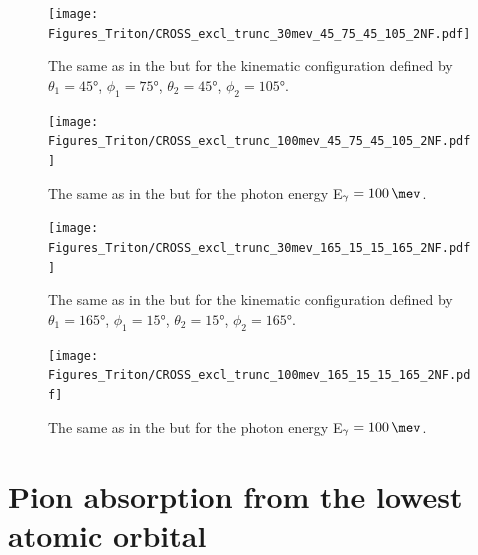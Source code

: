     \begin{figure}[h]
        \begin{center}
            \texttt{[image: Figures\_Triton/CROSS\_excl\_trunc\_30mev\_45\_75\_45\_105\_2NF.pdf]}
            \end{center}
            \caption{The same as in the  but for the kinematic
            configuration defined by
            $\theta_1 = \ang{45}$, $\phi_1 = \ang{75}$,
            $\theta_2 = \ang{45}$, $\phi_2 = \ang{105}$.}
            \label{CROSS_Triton_EXCL_45_75_45_105}
    \end{figure}


    \begin{figure}[h]
        \begin{center}
            \texttt{[image: Figures\_Triton/CROSS\_excl\_trunc\_100mev\_45\_75\_45\_105\_2NF.pdf]}
            \end{center}
            \caption{The same as in the  but for the photon energy
            E$_\gamma = \SI{100}{\mev}$.}
            \label{CROSS_Triton_EXCL_100mev_45_75_45_105}
    \end{figure}

    \begin{figure}[h]
        \begin{center}
            \texttt{[image: Figures\_Triton/CROSS\_excl\_trunc\_30mev\_165\_15\_15\_165\_2NF.pdf]}
            \end{center}
            \caption{The same as in the  but for the kinematic
            configuration defined by
            $\theta_1 = \ang{165}$, $\phi_1 = \ang{15}$,
            $\theta_2 = \ang{15}$, $\phi_2 = \ang{165}$.}
            \label{CROSS_Triton_EXCL_165_15_15_165}
    \end{figure}


    \begin{figure}[h]
        \begin{center}
            \texttt{[image: Figures\_Triton/CROSS\_excl\_trunc\_100mev\_165\_15\_15\_165\_2NF.pdf]}
            \end{center}
            \caption{The same as in the  but for the photon energy
            E$_\gamma = \SI{100}{\mev}$.}
            \label{CROSS_Triton_EXCL_100mev_165_15_15_165}
    \end{figure}
        
        
    \clearpage
\section{Pion absorption from the lowest atomic orbital}
\label{sec:pion_results}

